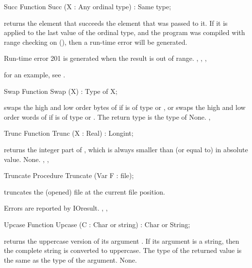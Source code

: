 \documentclass{report}
\begin{document}

\begin{function}{Succ}
\Declaration
Function Succ (X : Any ordinal type) : Same type;

\Description
  returns the element that succeeds the element that was passed
to it. If it is applied to the last value of the ordinal type, and the
program was compiled with range checking on (), then a run-time
error will be generated.

\Errors
Run-time error 201 is generated when the result is out of
range.
\SeeAlso
{}, , , 
\end{function}
for an example, see .
\begin{function}{Swap}
\Declaration
Function Swap (X) : Type of X;

\Description
{} swaps the high and low order bytes of  if  is of
type  or , or swaps the high and low order words of
 if  is of type  or .
The return type is the type of 
\Errors
None.
\SeeAlso
{}, 
\end{function}


\begin{function}{Trunc}
\Declaration
Function Trunc (X : Real) : Longint;

\Description
{} returns the integer part of , 
which is always smaller than (or equal to)  in absolute value.
\Errors
None.
\SeeAlso
{}, , 
\end{function}


\begin{procedure}{Truncate}
\Declaration
Procedure Truncate (Var F : file);

\Description
{} truncates the (opened) file  at the current file
position.

\Errors
Errors are reported by IOresult.
\SeeAlso
{}, ,
\end{procedure}


\begin{function}{Upcase}
\Declaration
Function Upcase (C : Char or string) : Char or String;

\Description
{} returns the uppercase version of its argument .
If its argument is a string, then the complete string is converted to
uppercase. The type of the returned value is the same as the type of the
argument.
\Errors
None.
\SeeAlso
{}
\end{function}
\end{document}

